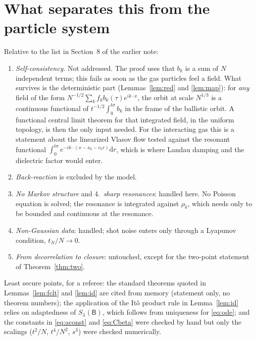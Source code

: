 \documentclass[11pt]{article}
\newcommand{\dd}{\mathrm{d}}
\newcommand{\sB}{\mathsf{B}}
\theoremstyle{remark}
\begin{document}
\section{What separates this from the particle system}

Relative to the list in Section~8 of the earlier note:
\begin{enumerate}
  \item \emph{Self-consistency.} Not addressed. The proof uses that $b_k$
    is a sum of $N$ independent terms; this fails as soon as the gas
    particles feel a field. What survives is the deterministic part
    (Lemmas~\ref{lem:red} and \ref{lem:map}): for \emph{any} field of the
    form $N^{-1/2}\sum_kf_kb_k(\tau)e^{ik\cdot x}$, the orbit at scale
    $N^{1/3}$ is a continuous functional of $t^{-1/2}\int_0^{t\sigma}b_k$ in
    the frame of the ballistic orbit. A functional central limit theorem for
    that integrated field, in the uniform topology, is then the only input
    needed. For the interacting gas this is a statement about the
    linearized Vlasov flow tested against the resonant functional
    $\int_0^{t\sigma}e^{-ik\cdot(x-x_0-v_0r)}\dd r$, which is where Landau
    damping and the dielectric factor would enter.
  \item \emph{Back-reaction} is excluded by the model.
  \item \emph{No Markov structure} and 4.\ \emph{sharp resonances}: handled
    here. No Poisson equation is solved; the resonance is integrated
    against $\rho_k$, which needs only to be bounded and continuous at the
    resonance.
  \item[5.] \emph{Non-Gaussian data}: handled; shot noise enters only
    through a Lyapunov condition, $t_N/N\to0$.
  \item[6.] \emph{From decorrelation to closure}: untouched, except for the
    two-point statement of Theorem~\ref{thm:two}.
\end{enumerate}
Least secure points, for a referee: the standard theorems quoted in
Lemmas~\ref{lem:fclt} and \ref{lem:id} are cited from memory (statement
only, no theorem numbers); the application of the It\^o product rule in
Lemma~\ref{lem:id} relies on adaptedness of $S_\lambda(\sB)$, which follows
from uniqueness for \eqref{eq:ode}; and the constants in
\eqref{eq:aconst} and \eqref{eq:Cbeta} were checked by hand but only the
scalings ($t^2/N$, $t^4/N^2$, $s^3$) were checked numerically.
\end{document}
